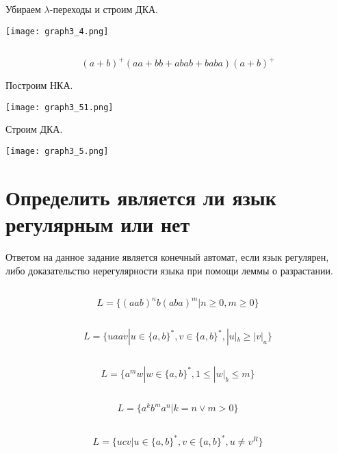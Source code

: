 \documentclass[a4paper, 12pt]{article}
\begin{document}
Убираем $\lambda$-переходы и строим ДКА.
\begin{center}
    \texttt{[image: graph3\_4.png]}
\end{center}

\subsection{}
$$(a + b)^+(aa + bb + abab + baba)(a + b)^+$$

Построим НКА.
\begin{center}
    \texttt{[image: graph3\_51.png]}
\end{center}

Строим ДКА.
\begin{center}
    \texttt{[image: graph3\_5.png]}
\end{center}
\newpage

\section{Определить является ли язык регулярным или нет}
Ответом на данное задание является конечный автомат, если язык регулярен, либо доказательство нерегулярности языка при помощи леммы о разрастании.

\subsection{}
$$L = \{(aab)^nb(aba)^m | n \geq 0, m \geq 0\}$$

\subsection{}
$$L = \{uaav | u \in \{a,b\}^*, v \in \{a,b\}^*, |u|_b \geq |v|_a\}$$

\subsection{}
$$L = \{a^mw | w \in \{a, b\}^*, 1 \leq |w|_b \leq m  \}$$

\subsection{}
$$L = \{ a^kb^ma^n | k = n \lor m > 0\}$$

\subsection{}
$$L = \{ ucv | u \in \{a,b\}^*, v \in \{a,b\}^*, u \neq v^R \}$$
\newpage
\end{document}

